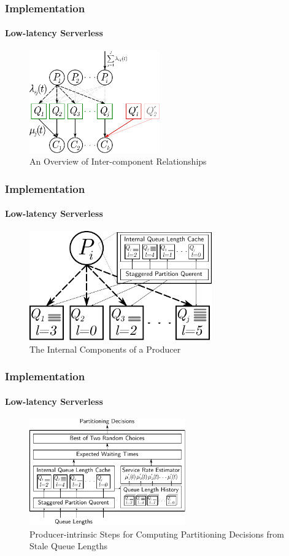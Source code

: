\documentclass[aspectratio=169]{beamer}
\begin{document}
\begin{frame}
	\frametitle{Implementation}
	\framesubtitle{Low-latency Serverless}

	\begin{figure}[h]
		\centering
		\includegraphics[width=0.5\textwidth]{diagram}
		\caption{An Overview of Inter-component Relationships}
	\end{figure}
\end{frame}

\begin{frame}
	\frametitle{Implementation}
	\framesubtitle{Low-latency Serverless}

	\begin{figure}[h]
		\centering
		\includegraphics[width=0.7\textwidth]{cache}
		\caption{The Internal Components of a Producer}
	\end{figure}
\end{frame}

\begin{frame}
	\frametitle{Implementation}
	\framesubtitle{Low-latency Serverless}

	\begin{figure}[h]
		\centering
		\includegraphics[width=0.6\textwidth]{service}
		\caption{Producer-intrinsic Steps for Computing Partitioning Decisions from Stale Queue Lengths}
	\end{figure}
\end{frame}
\end{document}
